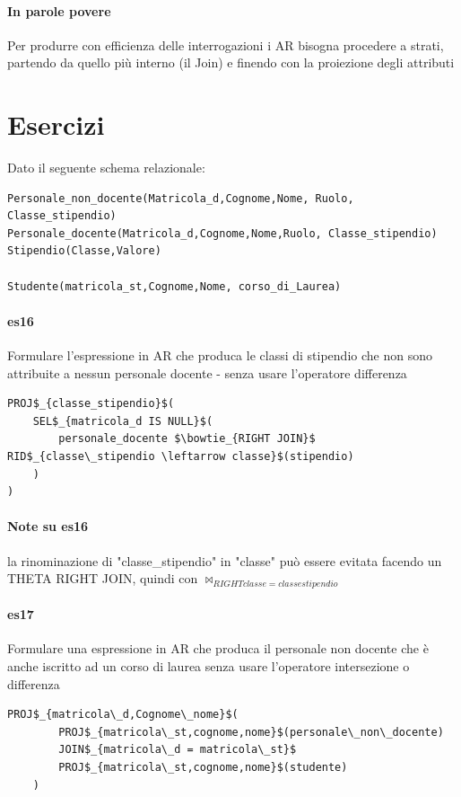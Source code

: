 \documentclass[12pt, a4paper, openany]{book}
\begin{document}
\paragraph{In parole povere}
Per produrre con efficienza delle interrogazioni i AR bisogna procedere a strati, partendo da quello più interno (il Join) e finendo con la proiezione degli attributi

\section{Esercizi}
Dato il seguente schema relazionale:
\begin{lstlisting}
Personale_non_docente(Matricola_d,Cognome,Nome, Ruolo, Classe_stipendio)
Personale_docente(Matricola_d,Cognome,Nome,Ruolo, Classe_stipendio)
Stipendio(Classe,Valore)

Studente(matricola_st,Cognome,Nome, corso_di_Laurea)

\end{lstlisting}
\paragraph{es16} Formulare l'espressione in AR che produca le classi di stipendio che non sono attribuite a nessun personale docente - senza usare l'operatore differenza
\begin{lstlisting}[mathescape=true]
PROJ$_{classe_stipendio}$(
    SEL$_{matricola_d IS NULL}$(
        personale_docente $\bowtie_{RIGHT JOIN}$ RID$_{classe\_stipendio \leftarrow classe}$(stipendio)
    )
)
\end{lstlisting}
\paragraph*{Note su es16}
la rinominazione di "classe\_stipendio" in "classe" può essere evitata facendo un THETA RIGHT JOIN,
quindi con $ \bowtie_{RIGHT classe = classestipendio} $


\paragraph*{es17}Formulare una espressione in AR che produca il personale non docente che è anche iscritto ad un corso di laurea senza usare l'operatore intersezione o differenza
\begin{lstlisting}[mathescape=true]
    PROJ$_{matricola\_d,Cognome\_nome}$(
        PROJ$_{matricola\_st,cognome,nome}$(personale\_non\_docente)
        JOIN$_{matricola\_d = matricola\_st}$
        PROJ$_{matricola\_st,cognome,nome}$(studente) 
    )   
\end{lstlisting}
\end{document}
